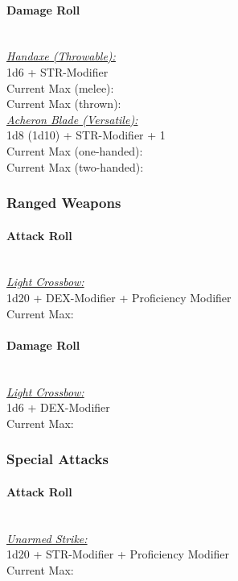 \documentclass[letterpaper,openany,oneside,twocolumn]{book}
\begin{document}
\paragraph*{Damage Roll}\hfill\\
\underline{\textit{Handaxe (Throwable):}}\\
1d6 + STR-Modifier\\
\indent Current Max (melee): \\
\indent Current Max (thrown): 
\\
\underline{\textit{Acheron Blade (Versatile):}}\\
1d8 (1d10) + STR-Modifier + 1\\
\indent Current Max (one-handed): \\
\indent Current Max (two-handed): 
\subsubsection*{Ranged Weapons}
\paragraph*{Attack Roll}\hfill\\
\underline{\textit{Light Crossbow:}}\\
1d20 + DEX-Modifier + Proficiency Modifier\\
\indent Current Max: 
\paragraph*{Damage Roll}\hfill\\
\underline{\textit{Light Crossbow:}}\\
1d6 + DEX-Modifier\\
\indent Current Max: 
\subsubsection*{Special Attacks}
\paragraph*{Attack Roll}\hfill\\
\underline{\textit{Unarmed Strike:}}\\
1d20 + STR-Modifier + Proficiency Modifier\\
\indent Current Max: 
\end{document}
